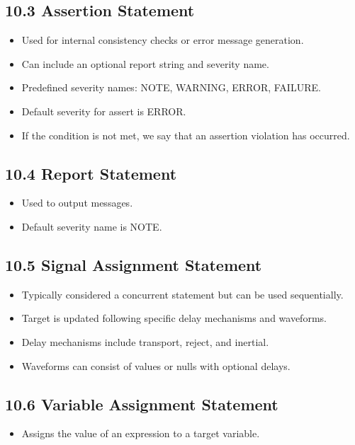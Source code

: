 \documentclass[a4paper,12pt]{article}
\begin{document}
	\subsection*{10.3 Assertion Statement}
	\begin{itemize}
		\item Used for internal consistency checks or error message generation.
		\item Can include an optional report string and severity name.
		\item Predefined severity names: NOTE, WARNING, ERROR, FAILURE.
		\item Default severity for assert is ERROR.
		\item If the condition is not met, we say that an assertion violation has
		occurred.
	\end{itemize}
	
	\subsection*{10.4 Report Statement}
	\begin{itemize}
		\item Used to output messages.
		\item Default severity name is NOTE.
	\end{itemize}
	
	\subsection*{10.5 Signal Assignment Statement}
	\begin{itemize}
		\item Typically considered a concurrent statement but can be used sequentially.
		\item Target is updated following specific delay mechanisms and waveforms.
		\item Delay mechanisms include transport, reject, and inertial.
		\item Waveforms can consist of values or nulls with optional delays.
	\end{itemize}
	
	\subsection*{10.6 Variable Assignment Statement}
	\begin{itemize}
		\item Assigns the value of an expression to a target variable.
	\end{itemize}
	
\end{document}
